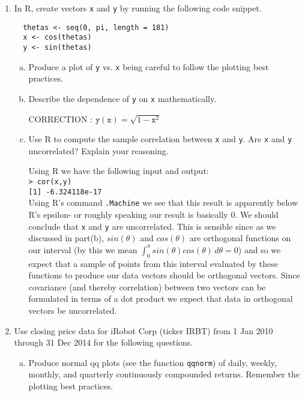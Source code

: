 \documentclass[letterpaper,12pt,fleqn]{article}
\begin{document}
\begin{enumerate}
\vspace{2em}

\item In R, create vectors \texttt{x} and \texttt{y} by running the following code snippet.

\begin{verbatim}
  thetas <- seq(0, pi, length = 181)
  x <- cos(thetas)
  y <- sin(thetas)
\end{verbatim}

\begin{enumerate}[a)]
\item Produce a plot of \texttt{y} vs. \texttt{x} being careful to follow the plotting best practices.

\item Describe the dependence of \texttt{y} on \texttt{x} mathematically.

CORRECTION : $ \texttt{y}(\texttt{x}) = \sqrt{1-\texttt{x}^2} \,$


\item Use R to compute the sample correlation between \texttt{x} and \texttt{y}.  Are \texttt{x} and \texttt{y} uncorrelated? Explain your reasoning.

Using R we have the following input and output: \\
\texttt{> cor(x,y)} \\
\texttt{[1] -6.324118e-17}\\
Using R's command \texttt{.Machine} we see that this result is apparently below R's epsilon- or roughly speaking our result is basically 0. We should conclude that \texttt{x} and \texttt{y} are uncorrelated. This is sensible since as we discussed in part(b), $sin(\theta)$ and $cos(\theta)$ are orthogonal functions on our interval (by this we mean $\int_{0}^{\pi} sin(\theta)cos(\theta) \, d\theta = 0$) and so we expect that a sample of points from this interval evaluated by these functions to produce our data vectors should be orthogonal vectors. Since covariance (and thereby correlation) between two vectors can be formulated in terms of a dot product we expect that data in orthogonal vectors be uncorrelated.
\end{enumerate}


\vspace{2em}

\item Use closing price data for iRobot Corp (ticker IRBT) from 1 Jan 2010 through 31 Dec 2014 for the following questions.

\begin{enumerate}[a)]
\item Produce normal qq plots (see the function \texttt{qqnorm}) of daily, weekly, monthly, and quarterly continuously compounded returns. Remember the plotting best practices.


\end{enumerate}
\end{enumerate}
\end{document}
